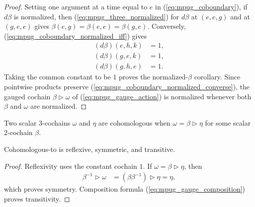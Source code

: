 \begin{proof}\leanok
    Setting one argument at a time equal to $e$ in
    (\ref{eq:mpug_coboundary}), if $d\beta$ is normalized, then
    (\ref{eq:mpug_three_normalized}) for $d\beta$ at $(e,e,g)$ and at
    $(g,e,e)$ gives $\beta(e,g)=\beta(e,e)=\beta(g,e)$. Conversely,
    (\ref{eq:mpug_coboundary_normalized_iff}) gives
    \begin{align}
        (d\beta)(e,h,k) & =1, \\
        (d\beta)(g,e,k) & =1, \\
        (d\beta)(g,h,e) & =1.
        \label{eq:mpug_coboundary_normalized_converse}
    \end{align}
    Taking the common constant to be $1$ proves the normalized-$\beta$
    corollary. Since pointwise products preserve
    (\ref{eq:mpug_coboundary_normalized_converse}), the gauged cochain
    $\beta\mathbin{\triangleright}\omega$ of (\ref{eq:mpug_gauge_action}) is
    normalized whenever both $\beta$ and $\omega$ are normalized.
\end{proof}

\begin{definition}
    \label{def:mpug_cohomologous_to}
    \leanok
    Two scalar $3$-cochains $\omega$ and $\eta$ are cohomologous when
    $\omega=\beta\mathbin{\triangleright}\eta$ for some scalar
    $2$-cochain $\beta$.
\end{definition}

\begin{lemma}
    \label{thm:mpug_cohomologous_to_equivalence}
    \leanok
    Cohomologous-to is reflexive, symmetric, and transitive.
\end{lemma}

\begin{proof}\leanok
    Reflexivity uses the constant cochain $1$. If $\omega=
        \beta\mathbin{\triangleright}\eta$, then
    \begin{align}
        \beta^{-1}\mathbin{\triangleright}\omega
         & =(\beta\beta^{-1})\mathbin{\triangleright}\eta
        =\eta,
    \end{align}
    which proves symmetry. Composition formula
    (\ref{eq:mpug_gauge_composition}) proves transitivity.
\end{proof}


